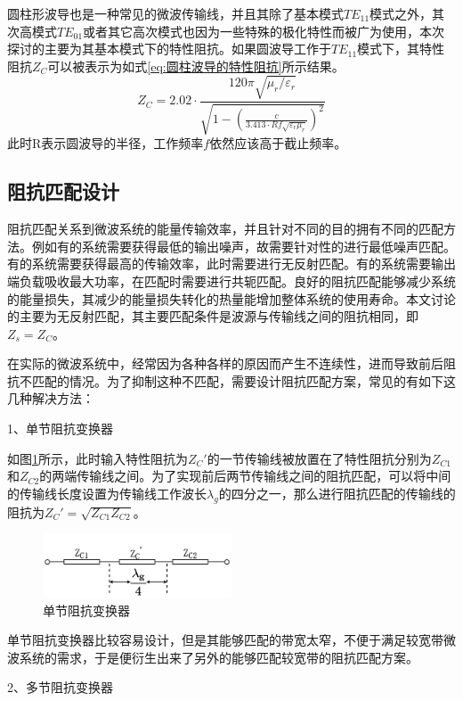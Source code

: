\documentclass[master]{thesis-uestc}
\begin{document}
圆柱形波导也是一种常见的微波传输线，并且其除了基本模式\(TE_{11}\)模式之外，其次高模式\(TE_{01}\)或者其它高次模式也因为一些特殊的极化特性而被广为使用，本次探讨的主要为其基本模式下的特性阻抗。如果圆波导工作于\(TE_{11}\)模式下，其特性阻抗\(Z_C\)可以被表示为如式\ref{eq:圆柱波导的特性阻抗}所示结果。
\begin{equation}\label{eq:圆柱波导的特性阻抗}
    Z_{C}= 2.02 \cdot \frac{120 \pi \sqrt{\mu_r / \varepsilon_r}}{\sqrt{1 - \left( \frac{c}{3.413 \cdot Rf \sqrt{\varepsilon_r \mu_r}} \right)^2}} 
\end{equation}
此时R表示圆波导的半径，工作频率\(f\)依然应该高于截止频率。
\subsection{阻抗匹配设计}
阻抗匹配关系到微波系统的能量传输效率，并且针对不同的目的拥有不同的匹配方法。例如有的系统需要获得最低的输出噪声，故需要针对性的进行最低噪声匹配。有的系统需要获得最高的传输效率，此时需要进行无反射匹配。有的系统需要输出端负载吸收最大功率，在匹配时需要进行共轭匹配。良好的阻抗匹配能够减少系统的能量损失，其减少的能量损失转化的热量能增加整体系统的使用寿命。本文讨论的主要为无反射匹配，其主要匹配条件是波源与传输线之间的阻抗相同，即\(Z_s=Z_C\)。

在实际的微波系统中，经常因为各种各样的原因而产生不连续性，进而导致前后阻抗不匹配的情况。为了抑制这种不匹配，需要设计阻抗匹配方案，常见的有如下这几种解决方法：

1、单节阻抗变换器

如图\ref{fig:单节阻抗变换器}所示，此时输入特性阻抗为\(Z_C'\)的一节传输线被放置在了特性阻抗分别为\(Z_{C1}\)和\(Z_{C2}\)的两端传输线之间。为了实现前后两节传输线之间的阻抗匹配，可以将中间的传输线长度设置为传输线工作波长\(\lambda_g\)的四分之一，那么进行阻抗匹配的传输线的阻抗为\(Z_C'=\sqrt{Z_{C1} Z_{C2}}\)。
\begin{figure}[!htb]
    \centering
    \includegraphics[width=0.5\textwidth]{pic/chapter2/单节阻抗变换器.png}
    \caption{单节阻抗变换器}
    \label{fig:单节阻抗变换器}
\end{figure}
单节阻抗变换器比较容易设计，但是其能够匹配的带宽太窄，不便于满足较宽带微波系统的需求，于是便衍生出来了另外的能够匹配较宽带的阻抗匹配方案。

2、多节阻抗变换器
\end{document}
